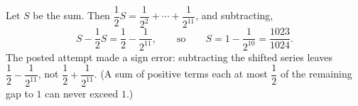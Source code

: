Let $S$ be the sum. Then $\dfrac{1}{2}S=\dfrac{1}{2^2}+\cdots+\dfrac{1}{2^{11}}$, and subtracting,
\[S-\dfrac{1}{2}S=\dfrac{1}{2}-\dfrac{1}{2^{11}},\qquad\text{so}\qquad S=1-\dfrac{1}{2^{10}}=\boxed{\dfrac{1023}{1024}}.\]
The posted attempt made a sign error: subtracting the shifted series leaves $\dfrac{1}{2}-\dfrac{1}{2^{11}}$, not $\dfrac{1}{2}+\dfrac{1}{2^{11}}$. (A sum of positive terms each at most $\dfrac{1}{2}$ of the remaining gap to $1$ can never exceed $1$.)
